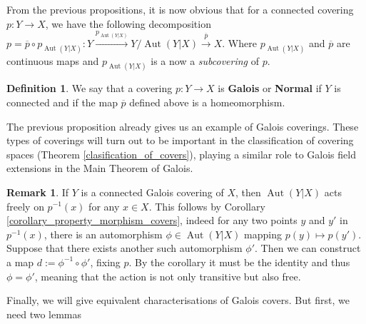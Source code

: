 \documentclass{article}
\theoremstyle{plain}
\theoremstyle{definition}
\newtheorem{definition}[theorem]{Definition}
\newtheorem{remark}{Remark}
\DeclareMathOperator{\Aut}{Aut}
\begin{document}
\noindent From the previous propositions, it is now obvious that for a connected covering $p:Y\rightarrow X$, 
we have the following decomposition $p = \overline{p} \circ p_{\Aut(Y|X)} : Y\xrightarrow{p_{\Aut(Y|X)}} Y/ \Aut(Y|X) \xrightarrow{\overline{p}} X$. Where $p_{\Aut(Y|X)}$ and $\overline{p}$ are continuous maps and $p_{\Aut(Y|X)}$ is a now a \textit{subcovering} of $p$.



\begin{definition}
    We say that a covering $p:Y\rightarrow X$ is \textbf{Galois} or \textbf{Normal} if $Y$ is connected and if the map $\overline{p}$ defined above is a homeomorphism.
\end{definition}

\noindent The previous proposition already gives us an example of Galois coverings.
These types of coverings will turn out to be important in the classification of covering spaces (Theorem \ref{clasification_of_covers}), playing a similar role to Galois field extensions in the Main Theorem of Galois. 

\begin{remark}
\label{Galois_free}
    If $Y$ is a connected Galois covering of $X$, then $\Aut(Y|X)$ acts freely on $p^{-1}(x)$ for any $x\in X$.
    This follows by Corollary \ref{corollary_property_morphism_covers}, indeed for any two points $y$ and $y'$ in $p^{-1}(x)$, there is an automorphism $\phi\in \Aut(Y|X)$ mapping $p(y)\mapsto p(y')$.
    Suppose that there exists another such automorphism $\phi'$.
    Then we can construct a map $d:= \phi^{-1}\circ \phi'$, fixing $p$. 
    By the corollary it must be the identity and thus $\phi=\phi'$, 
    meaning that the action is not only transitive but also free.
\end{remark}

\noindent Finally, we will give equivalent characterisations of Galois covers. But first, we need two lemmas
\end{document}

